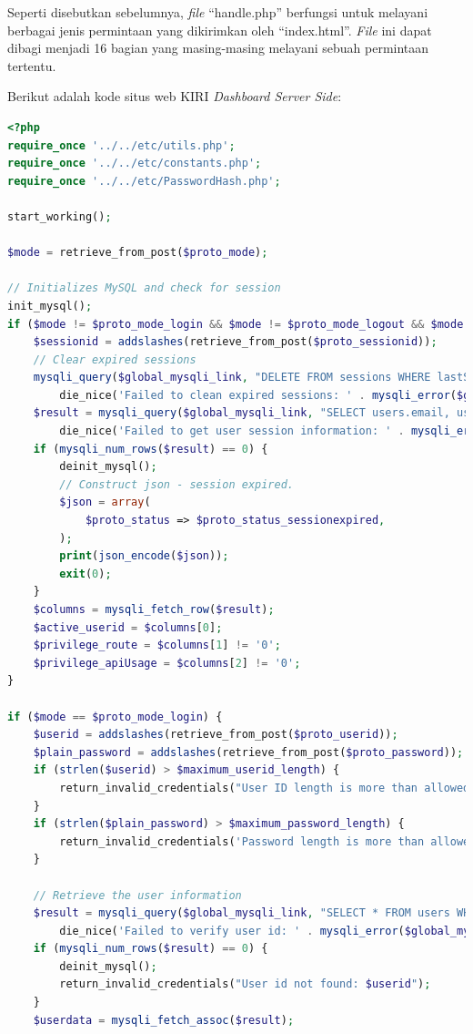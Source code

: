 \documentclass[a4paper,twoside]{article}
\begin{document}
\begin{enumerate}
Seperti disebutkan sebelumnya, \textit{file} ``handle.php'' berfungsi untuk melayani berbagai jenis permintaan yang dikirimkan oleh ``index.html''. \textit{File} ini dapat dibagi menjadi 16 bagian yang masing-masing melayani sebuah permintaan tertentu.

Berikut adalah kode situs web KIRI \textit{Dashboard Server Side}:
\begin{lstlisting}[language=PHP,basicstyle=\tiny,caption=handle.php,label={lst:handle.php}]
<?php
require_once '../../etc/utils.php';
require_once '../../etc/constants.php';
require_once '../../etc/PasswordHash.php';

start_working();

$mode = retrieve_from_post($proto_mode);

// Initializes MySQL and check for session
init_mysql();
if ($mode != $proto_mode_login && $mode != $proto_mode_logout && $mode != $proto_mode_register) {
	$sessionid = addslashes(retrieve_from_post($proto_sessionid));
	// Clear expired sessions
	mysqli_query($global_mysqli_link, "DELETE FROM sessions WHERE lastSeen < (NOW() - INTERVAL $session_expiry_interval_mysql)") or
		die_nice('Failed to clean expired sessions: ' . mysqli_error($global_mysqli_link), true);
	$result = mysqli_query($global_mysqli_link, "SELECT users.email, users.privilegeRoute, users.privilegeApiUsage FROM users LEFT JOIN sessions ON users.email = sessions.email WHERE sessions.sessionId = '$sessionid'") or
		die_nice('Failed to get user session information: ' . mysqli_error($global_mysqli_link), true);
	if (mysqli_num_rows($result) == 0) {
		deinit_mysql();
		// Construct json - session expired.
		$json = array(
			$proto_status => $proto_status_sessionexpired,
		);
		print(json_encode($json));
		exit(0);
	}
	$columns = mysqli_fetch_row($result);
	$active_userid = $columns[0]; 
	$privilege_route = $columns[1] != '0';
	$privilege_apiUsage = $columns[2] != '0';
}

if ($mode == $proto_mode_login) {
	$userid = addslashes(retrieve_from_post($proto_userid));
	$plain_password = addslashes(retrieve_from_post($proto_password));
	if (strlen($userid) > $maximum_userid_length) {
		return_invalid_credentials("User ID length is more than allowed (". strlen($userid) . ')');
	}
	if (strlen($plain_password) > $maximum_password_length) {
		return_invalid_credentials('Password length is more than allowed ('. strlen($password) . ')');
	}

	// Retrieve the user information
	$result = mysqli_query($global_mysqli_link, "SELECT * FROM users WHERE email='$userid'") or
		die_nice('Failed to verify user id: ' . mysqli_error($global_mysqli_link), true);
	if (mysqli_num_rows($result) == 0) {
		deinit_mysql();
		return_invalid_credentials("User id not found: $userid");
	}
	$userdata = mysqli_fetch_assoc($result);
	

\end{lstlisting}
\end{enumerate}
\end{document}
